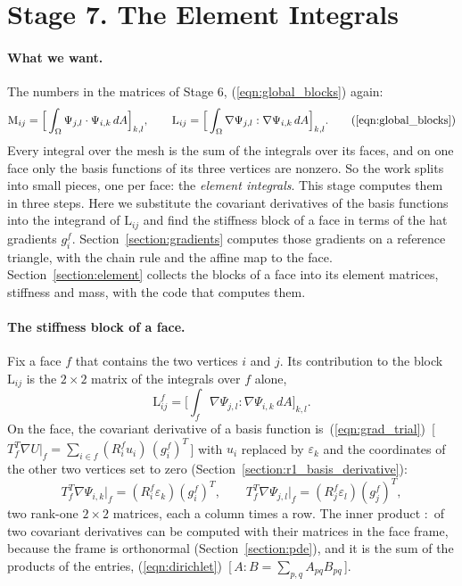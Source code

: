 \section{Stage 7. The Element Integrals}
\label{section:r1_element_integrals}

\paragraph{What we want.} The numbers in the matrices of Stage 6, (\ref{eqn:global_blocks}) again:
\begin{equation*}
\mathrm M_{ij} = \Big[ \int_\Omega \Psi_{j,l} \cdot \Psi_{i,k}\, dA \Big]_{k,l}, \qquad \mathrm L_{ij} = \Big[ \int_\Omega \nabla \Psi_{j,l} : \nabla \Psi_{i,k}\, dA \Big]_{k,l}. \tag{\ref{eqn:global_blocks}}
\end{equation*}
Every integral over the mesh is the sum of the integrals over its faces, and on one face only the basis functions of its three vertices are nonzero. So the work splits into small pieces, one per face: the \emph{element integrals}. This stage computes them in three steps. Here we substitute the covariant derivatives of the basis functions into the integrand of $\mathrm L_{ij}$ and find the stiffness block of a face in terms of the hat gradients $g_i^f$. Section~\ref{section:gradients} computes those gradients on a reference triangle, with the chain rule and the affine map to the face. Section~\ref{section:element} collects the blocks of a face into its element matrices, stiffness and mass, with the code that computes them.

\paragraph{The stiffness block of a face.} Fix a face $f$ that contains the two vertices $i$ and $j$. Its contribution to the block $\mathrm L_{ij}$ is the $2\times 2$ matrix of the integrals over $f$ alone,
\begin{equation*}
\mathrm L^f_{ij} = \Big[ \int_f \nabla \Psi_{j,l} : \nabla \Psi_{i,k}\, dA \Big]_{k,l} .
\end{equation*}
On the face, the covariant derivative of a basis function is~(\ref{eqn:grad_trial})~[\,$T_f^T \nabla U|_f = \sum_{i \in f} (R_i^f u_i)\, (g_i^f)^T$\,] with $u_i$ replaced by $\varepsilon_k$ and the coordinates of the other two vertices set to zero (Section~\ref{section:r1_basis_derivative}):
\begin{equation*}
T_f^T\nabla \Psi_{i,k}\big|_f = (R_i^f\varepsilon_k)(g_i^f)^T, \qquad T_f^T\nabla \Psi_{j,l}\big|_f = (R_j^f\varepsilon_l)(g_j^f)^T ,
\end{equation*}
two rank-one $2\times 2$ matrices, each a column times a row. The inner product $:$ of two covariant derivatives can be computed with their matrices in the face frame, because the frame is orthonormal (Section~\ref{section:pde}), and it is the sum of the products of the entries, (\ref{eqn:dirichlet})~[\,$A : B = \sum_{p,q} A_{pq}B_{pq}$\,].

